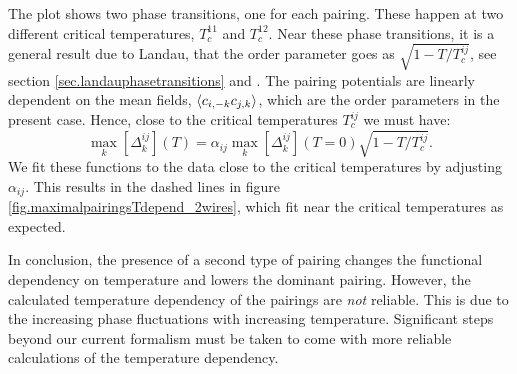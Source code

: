 The plot shows two phase transitions, one for each pairing. These happen at two different critical temperatures, $T^{11}_{c}$ and $T^{12}_{c}$. Near these phase transitions, it is a general result due to Landau, that the order parameter goes as $\sqrt{1 - T/T^{ij}_c}$, see section \ref{sec.landauphasetransitions} and \cite[86-87]{PlischkeStatPhys}. The pairing potentials are linearly dependent on the mean fields, $\braket{c_{i, -k}c_{j,k}}$, which are the order parameters in the present case. Hence, close to the critical temperatures $T^{ij}_c$ we must have:
\begin{equation}
\max_k[\Delta^{ij}_k](T) = \alpha_{ij} \max_k[\Delta^{ij}_k](T = 0) \sqrt{1 - T/T^{ij}_c}. 
\label{eq.DeltaasymptoteTc}
\end{equation}
We fit these functions to the data close to the critical temperatures by adjusting $\alpha_{ij}$. This results in the dashed lines in figure \ref{fig.maximalpairingsTdepend_2wires}, which fit near the critical temperatures as expected. 

In conclusion, the presence of a second type of pairing changes the functional dependency on temperature and lowers the dominant pairing. However, the calculated temperature dependency of the pairings are \textit{not} reliable. This is due to the increasing phase fluctuations with increasing temperature. Significant steps beyond our current formalism must be taken to come with more reliable calculations of the temperature dependency. 

